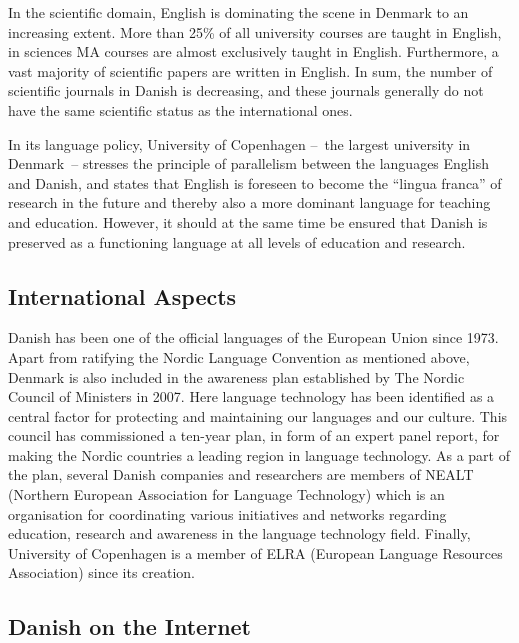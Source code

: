 \begin{multicols}{2}
In the scientific domain, English is dominating the scene in Denmark to an increasing extent. More than 25\% of all university courses are taught in English, in sciences MA courses are almost exclusively taught in English. Furthermore, a vast majority of scientific papers are written in English. In sum, the number of scientific journals in Danish is decreasing, and these journals generally do not have the same scientific status as the international ones.


In its language policy, University of Copenhagen --~the largest university in Denmark~-- stresses the principle of parallelism between the languages English and Danish, and states that English is foreseen to become the ``lingua franca'' of research in the future and thereby also a more dominant language for teaching and education. However, it should at the same time be ensured that Danish is preserved as a functioning language at all levels of education and research.

\subsection{International Aspects}

  Danish has been one of the official languages of the European Union since 1973.  Apart from ratifying the Nordic Language Convention as mentioned above, Denmark is also included in the awareness plan established by The Nordic Council of Ministers in 2007. Here language technology has been identified as a central factor for protecting and maintaining our languages and our culture. This council has commissioned a ten-year plan, in form of an expert panel report, for making the Nordic countries a leading region in language technology. As a part of the plan, several Danish companies and researchers are members of NEALT (Northern European Association for Language Technology) which is an organisation for coordinating various initiatives and networks regarding education, research and awareness in the language technology field. Finally, University of Copenhagen is a member of ELRA (European Language Resources Association) since its creation.


\subsection{Danish on the Internet}


\end{multicols}
